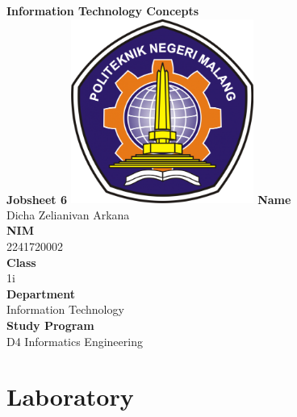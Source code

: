 \documentclass[12pt,titlepage]{article}
\newcommand{\vSubject}{Information Technology Concepts}
\newcommand{\vSubtitle}{Jobsheet 6}
\newcommand{\vName}{Dicha Zelianivan Arkana}
\newcommand{\vNIM}{2241720002}
\newcommand{\vClass}{1i}
\newcommand{\vDepartment}{Information Technology}
\newcommand{\vStudyProgram}{D4 Informatics Engineering}
\begin{document}
\begin{titlepage}
    \centering
    \vfill
    {\bfseries\LARGE
        \vSubject\\
        \vskip0.25cm
        \vSubtitle
    }
    \vfill
    \includegraphics[width=6cm]{images/polinema-logo.png}
    \vfill
    {
        \textbf{Name}\\
        \vName\\
        \vskip0.5cm
        \textbf{NIM}\\
        \vNIM\\
        \vskip0.5cm
        \textbf{Class}\\
        \vClass\\
        \vskip0.5cm
        \textbf{Department}\\
        \vDepartment\\
        \vskip0.5cm
        \textbf{Study Program}\\
        \vStudyProgram
    }
\end{titlepage}

\tableofcontents
\pagebreak

\section{Laboratory}
\end{document}
